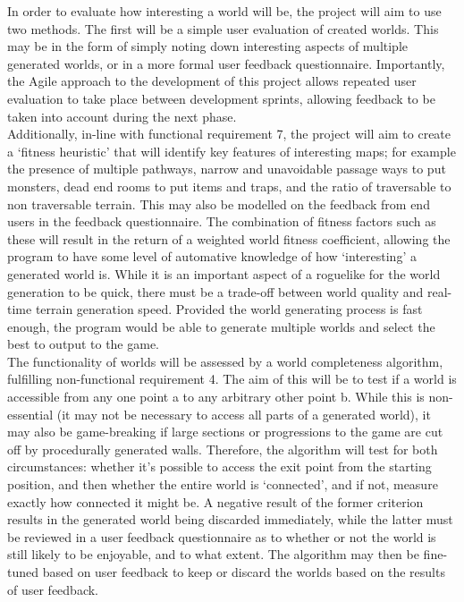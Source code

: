 \documentclass[12pt,a4paper]{article}
\begin{document}
In order to evaluate how interesting a world will be, the project will aim to use two methods. The first will be a simple user evaluation of created worlds. This may be in the form of simply noting down interesting aspects of multiple generated worlds, or in a more formal user feedback questionnaire. Importantly, the Agile approach to the development of this project allows repeated user evaluation to take place between development sprints, allowing feedback to be taken into account during the next phase. \\

Additionally, in-line with functional requirement 7, the project will aim to create a `fitness heuristic' that will identify key features of interesting maps; for example the presence of multiple pathways, narrow and unavoidable passage ways to put monsters, dead end rooms to put items and traps, and the ratio of traversable to non traversable terrain. This may also be modelled on the feedback from end users in the feedback questionnaire. The combination of fitness factors such as these will result in the return of a weighted world fitness coefficient, allowing the program to have some level of automative knowledge of how `interesting' a generated world is. While it is an important aspect of a roguelike for the world generation to be quick, there must be a trade-off between world quality and real-time terrain generation speed. Provided the world generating process is fast enough, the program would be able to generate multiple worlds and select the best to output to the game. \\

The functionality of worlds will be assessed by a world completeness algorithm, fulfilling non-functional requirement 4. The aim of this will be to test if a world is accessible from any one point a to any arbitrary other point b. While this is non-essential (it may not be necessary to access all parts of a generated world), it may also be game-breaking if large sections or progressions to the game are cut off by procedurally generated walls. Therefore, the algorithm will test for both circumstances: whether it's possible to access the exit point from the starting position, and then whether the entire world is `connected', and if not, measure exactly how connected it might be. A negative result of the former criterion results in the generated world being discarded immediately, while the latter must be reviewed in a user feedback questionnaire as to whether or not the world is still likely to be enjoyable, and to what extent. The algorithm may then be fine-tuned based on user feedback to keep or discard the worlds based on the results of user feedback. 
\end{document}
